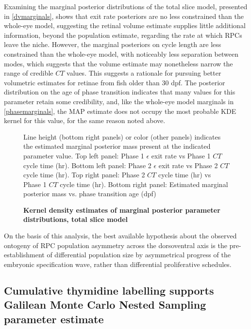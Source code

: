 Examining the marginal posterior distributions of the total slice model, presented in \autoref{dvmarginals}, shows that exit rate posteriors are no less constrained than the whole-eye model, suggesting the retinal volume estimate supplies little additional  information, beyond the population estimate, regarding the rate at which RPCs leave the niche. However, the marginal posteriors on cycle length are less constrained than the whole-eye model, with noticeably less separation between modes, which suggests that the volume estimate may nonetheless narrow the range of credible $CT$ values. This suggests a rationale for pursuing better volumetric estimates for retinae from fish older than 30 dpf. The posterior distribution on the age of phase transition indicates that many values for this parameter retain some credibility, and, like the whole-eye model marginals in \autoref{phasemarginals}, the MAP estimate does not occupy the most probable KDE kernel for this value, for the same reason noted above.

\begin{figure}[!h]
    \caption{{\bf Kernel density estimates of marginal posterior parameter distributions, total slice model}}
    Line height (bottom right panels) or color (other panels) indicates the estimated marginal posterior mass present at the indicated parameter value.
    Top left panel: Phase 1 $\epsilon$ exit rate vs Phase 1 $CT$ cycle time (hr).
    Bottom left panel: Phase 2 $\epsilon$ exit rate vs Phase 2 $CT$ cycle time (hr).
    Top right panel: Phase 2 $CT$ cycle time (hr) vs Phase 1 $CT$ cycle time (hr).
    Bottom right panel: Estimated marginal posterior mass vs. phase transition age (dpf)
    \label{dvmarginals}
\end{figure}

On the basis of this analysis, the best available hypothesis about the observed ontogeny of RPC population asymmetry across the dorsoventral axis is the pre-establishment of differential population size by asymmetrical progress of the embryonic specification wave, rather than differential proliferative schedules.

\subsection{Cumulative thymidine labelling supports Galilean Monte Carlo Nested Sampling parameter estimate}

